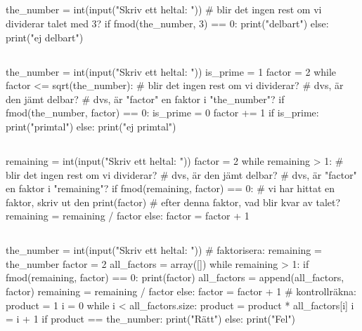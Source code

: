 \subsection*{}
\vspace{3pt}
\begin{python}
the_number = int(input("Skriv ett heltal: "))
# blir det ingen rest om vi dividerar talet med 3?
if fmod(the_number, 3) == 0:
	print("delbart")
else:
	print("ej delbart")
\end{python}

\subsection*{}
\vspace{3pt}
\begin{python}
the_number = int(input("Skriv ett heltal: "))
is_prime = 1
factor = 2
while factor <= sqrt(the_number):
	# blir det ingen rest om vi dividerar?
	# dvs, är den jämt delbar?
	# dvs, är "factor" en faktor i "the_number"?
	if fmod(the_number, factor) == 0:
		is_prime = 0
	factor += 1
if is_prime:
	print("primtal")
else:
	print("ej primtal")
\end{python}
\newpage
\subsection*{}
\vspace{3pt}
\begin{python}
remaining = int(input("Skriv ett heltal: "))
factor = 2
while remaining > 1:
	# blir det ingen rest om vi dividerar?
	# dvs, är den jämt delbar?
	# dvs, är "factor" en faktor i "remaining"?
	if fmod(remaining, factor) == 0:
		# vi har hittat en faktor, skriv ut den
		print(factor)
		# efter denna faktor, vad blir kvar av talet?
		remaining = remaining / factor
	else:
		factor = factor + 1
\end{python}

\subsection*{}
\vspace{3pt}
\begin{python}
the_number = int(input("Skriv ett heltal: "))
# faktorisera:
remaining = the_number
factor = 2
all_factors = array([])
while remaining > 1:
	if fmod(remaining, factor) == 0:
		print(factor)
		all_factors = append(all_factors, factor)
		remaining = remaining / factor
	else:
		factor = factor + 1
# kontrollräkna:
product = 1
i = 0
while i < all_factors.size:
	product = product * all_factors[i]
	i = i + 1
if product == the_number:
	print("Rätt")
else:
	print("Fel")
\end{python}


